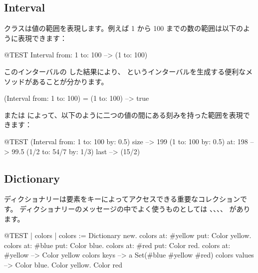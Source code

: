 \documentclass[a4paper,10pt,twoside]{book}
\begin{document}

\subsection{Interval}
 クラスは値の範囲を表現します。例えば 1 から 100 までの数の範囲は以下のように表現できます：
\begin{code}{@TEST}
Interval from: 1 to: 100 --> (1 to: 100)
\end{code}

\noindent
このインターバルの  した結果により、 というインターバルを生成する便利なメソッドがあることが分かります。

\begin{code}{}
(Interval from: 1 to: 100) = (1 to: 100) --> true
\end{code}

 または  によって、以下のように二つの値の間にある刻みを持った範囲を表現できます：

\begin{code}{@TEST}
(Interval from: 1 to: 100 by: 0.5) size --> 199
(1 to: 100 by: 0.5) at: 198 --> 99.5
(1/2 to: 54/7 by: 1/3) last --> (15/2)
\end{code}

\subsection{Dictionary}
ディクショナリーは要素をキーによってアクセスできる重要なコレクションです。
ディクショナリーのメッセージの中でよく使うものとしては 、、、、 があります。

\begin{code}{@TEST | colors |}
colors := Dictionary new.
colors at: #yellow put: Color yellow.
colors at: #blue put: Color blue.
colors at: #red put: Color red.
colors at: #yellow --> Color yellow
colors keys          --> a Set(#blue #yellow #red)
colors values       --> {Color blue. Color yellow. Color red}
\end{code}
\end{document}

